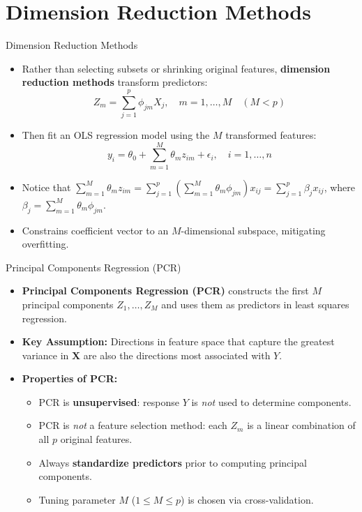 \documentclass[aspectratio=169, 11pt]{beamer}
\begin{document}
\section{Dimension Reduction Methods}

\begin{frame}{Dimension Reduction Methods}
    \begin{itemize}
        \item Rather than selecting subsets or shrinking original features, \textbf{dimension reduction methods} transform predictors:
        \[
            Z_m = \sum_{j=1}^p \phi_{jm} X_j, \quad m = 1, \dots, M \quad (M < p)
        \]
        \item Then fit an OLS regression model using the $M$ transformed features:
        \[
            y_i = \theta_0 + \sum_{m=1}^M \theta_m z_{im} + \epsilon_i, \quad i = 1, \dots, n
        \]
        \item Notice that $\sum_{m=1}^M \theta_m z_{im} = \sum_{j=1}^p \left(\sum_{m=1}^M \theta_m \phi_{jm}\right) x_{ij} = \sum_{j=1}^p \beta_j x_{ij}$, where $\beta_j = \sum_{m=1}^M \theta_m \phi_{jm}$.
        \item Constrains coefficient vector to an $M$-dimensional subspace, mitigating overfitting.
    \end{itemize}
\end{frame}

\begin{frame}{Principal Components Regression (PCR)}
    \begin{itemize}
        \item \textbf{Principal Components Regression (PCR)} constructs the first $M$ principal components $Z_1, \dots, Z_M$ and uses them as predictors in least squares regression.
        \vspace{0.4em}
        \item \textbf{Key Assumption:} Directions in feature space that capture the greatest variance in $\mathbf{X}$ are also the directions most associated with $Y$.
        \vspace{0.4em}
        \item \textbf{Properties of PCR:}
        \begin{itemize}
            \item PCR is \textbf{unsupervised}: response $Y$ is \emph{not} used to determine components.
            \item PCR is \emph{not} a feature selection method: each $Z_m$ is a linear combination of all $p$ original features.
            \item Always \textbf{standardize predictors} prior to computing principal components.
            \item Tuning parameter $M$ ($1 \le M \le p$) is chosen via cross-validation.
        \end{itemize}
    \end{itemize}
\end{frame}
\end{document}
